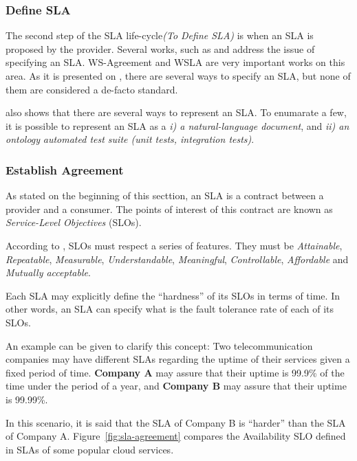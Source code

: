 \subsubsection{Define SLA}
The second step of the SLA life-cycle\textit{(To Define SLA)} is when an SLA is proposed by the provider. Several works, such as \cite{6846456} and \cite{kouki:hal-00675077} address the issue of specifying an SLA. WS-Agreement \cite{citeulike:2805191} and WSLA \cite{4578560} are very important works on this area. As it is presented on \cite{fabioMartinSM} , there are several ways to specify an SLA, but none of them are considered a de-facto standard. 

\cite{fabioMartinSM} also shows that there are several ways to represent an SLA. To enumarate a few, it is possible to represent an SLA as a \textit{i) a natural-language document}, and \textit{ii) an ontology} \textit{automated test suite (unit tests, integration tests)}.

\subsubsection{Establish Agreement}

As stated on the beginning of this secttion, an SLA is a contract between a provider and a consumer. The points of interest of this contract are known as \textit{Service-Level Objectives} (SLOs).

According to \cite{sturm2000foundations}, SLOs must respect a series of features. They must be \textit{Attainable},  \textit{Repeatable},  \textit{Measurable},  \textit{Understandable},  \textit{Meaningful},  \textit{Controllable},  \textit{Affordable} and \textit{Mutually acceptable}. 

Each SLA may explicitly define the ``hardness'' of its SLOs in terms of time. In other words, an SLA can specify what is the fault tolerance rate of each of its SLOs. 

An example can be given to clarify this concept: Two telecommunication companies may have different SLAs regarding the uptime of their services given a fixed period of time. \textbf{Company A} may assure that their uptime is 99.9\% of the time under the period of a year, and \textbf{Company B} may assure that their uptime is 99.99\%. 

In this scenario, it is said that the SLA of Company B is ``harder'' than the SLA of Company A. Figure~\ref{fig:sla-agreement} compares the Availability SLO defined in SLAs of some popular cloud services.

